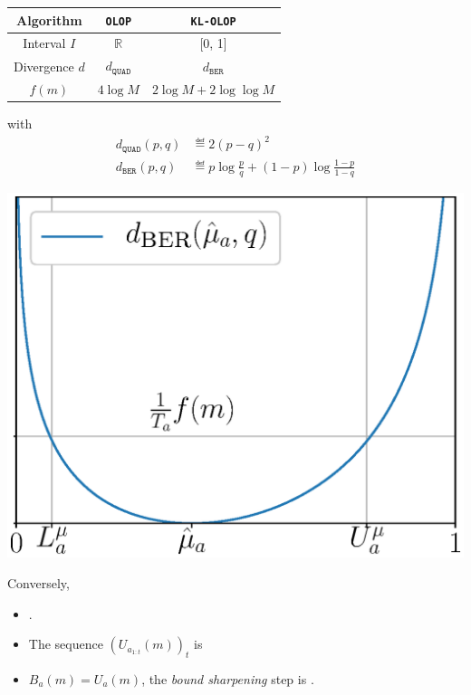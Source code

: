 \documentclass[a0paper,portrait,fontscale=0.35, margin=2cm]{baposter}
\begin{document}
\begin{poster}
{\begin{minipage}[]{0.59\textwidth}
    \begin{center}
    \begin{tabular}{ccc}
    \toprule
        Algorithm & \texttt{OLOP} & \texttt{KL-OLOP} \\
        \midrule
        Interval $I$ & $\mathbb{R}$ & [0, 1] \\
        Divergence $d$ & $d_{\texttt{QUAD}}$ & $d_{\texttt{BER}}$ \\
        $f(m)$ & $4 \log M$ & $2\log M + 2 \log\log M$\\
        \bottomrule
    \end{tabular}
    \end{center}
    with
    \begin{align*}
    d_{\texttt{QUAD}}(p,q) &\eqdef 2(p-q)^2\\
    d_{\texttt{BER}}(p, q) &\eqdef p \log \frac{p}{q} + (1-p)\log\frac{1-p}{1-q}
    \end{align*}
\end{minipage}
\begin{minipage}[]{0.4\textwidth}
    \includegraphics[width=\textwidth]{../img/ukl}
\end{minipage}
    
Conversely,
\begin{itemize}
    \item {}. 
    \item The sequence $(U_{a_{1:t}}(m))_t$ is 
    \item $B_a(m) = U_a(m)$, the \emph{bound sharpening} step is .
\end{itemize}
}


\end{poster}
\end{document}
